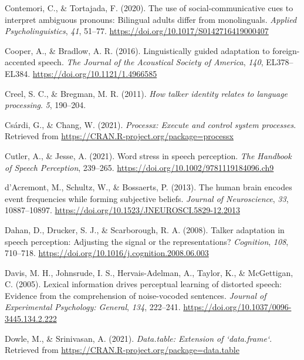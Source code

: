 \documentclass[
  11pt,
  man,floatsintext]{apa6}
\newlength{\cslhangindent}
\newlength{\cslentryspacingunit} %
\newenvironment{CSLReferences}[2] %
 {%
  \setlength{\parindent}{0pt}
  \ifodd #1
  \let\oldpar\par
  \def\par{\hangindent=\cslhangindent\oldpar}
  \fi
  \setlength{\parskip}{#2\cslentryspacingunit}
 }%
 {}
\begin{document}
\begin{CSLReferences}{1}{0}
\leavevmode{}%
Contemori, C., \& Tortajada, F. (2020). The use of social-communicative cues to interpret ambiguous pronouns: Bilingual adults differ from monolinguals. \emph{Applied Psycholinguistics}, \emph{41}, 51--77. \url{https://doi.org/10.1017/S0142716419000407}

\leavevmode{}%
Cooper, A., \& Bradlow, A. R. (2016). Linguistically guided adaptation to foreign-accented speech. \emph{The Journal of the Acoustical Society of America}, \emph{140}, EL378--EL384. \url{https://doi.org/10.1121/1.4966585}

\leavevmode{}%
Creel, S. C., \& Bregman, M. R. (2011). \emph{How talker identity relates to language processing}. \emph{5}, 190--204.

\leavevmode{}%
Csárdi, G., \& Chang, W. (2021). \emph{Processx: Execute and control system processes}. Retrieved from \url{https://CRAN.R-project.org/package=processx}

\leavevmode{}%
Cutler, A., \& Jesse, A. (2021). Word stress in speech perception. \emph{The Handbook of Speech Perception}, 239--265. \url{https://doi.org/10.1002/9781119184096.ch9}

\leavevmode{}%
d'Acremont, M., Schultz, W., \& Bossaerts, P. (2013). The human brain encodes event frequencies while forming subjective beliefs. \emph{Journal of Neuroscience}, \emph{33}, 10887--10897. \url{https://doi.org/10.1523/JNEUROSCI.5829-12.2013}

\leavevmode{}%
Dahan, D., Drucker, S. J., \& Scarborough, R. A. (2008). Talker adaptation in speech perception: Adjusting the signal or the representations? \emph{Cognition}, \emph{108}, 710--718. \url{https://doi.org/10.1016/j.cognition.2008.06.003}

\leavevmode{}%
Davis, M. H., Johnsrude, I. S., Hervais-Adelman, A., Taylor, K., \& McGettigan, C. (2005). Lexical information drives perceptual learning of distorted speech: Evidence from the comprehension of noise-vocoded sentences. \emph{Journal of Experimental Psychology: General}, \emph{134}, 222--241. \url{https://doi.org/10.1037/0096-3445.134.2.222}

\leavevmode{}%
Dowle, M., \& Srinivasan, A. (2021). \emph{Data.table: Extension of `data.frame`}. Retrieved from \url{https://CRAN.R-project.org/package=data.table}


\end{CSLReferences}
\end{document}
